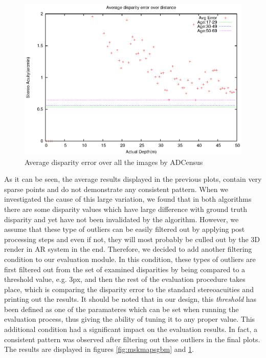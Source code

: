 \begin{figure}[H]
\centering
\includegraphics[scale=0.8]{adcenmsk1000}
\caption{Average disparity error over all the images by ADCensus}
\label{fig:mskmapadc}
\end{figure} 

As it can be seen, the average results displayed in the previous plots, contain very sparse points and 
do not demonstrate any consistent pattern. When we investigated the cause of this large variation, we found that in
both algorithms there are some disparity values which have large difference with ground truth disparity and yet have not been invalidated by the
algorithm. However, we assume that these type of outliers can be easily filtered out by applying post processing steps and even if 
not, they will most probably be culled out by the 3D render in AR system in the end. Therefore, we decided to add another filtering condition to our 
evaluation module. In this condition, these types of outliers are first filtered out from the set of examined disparities by being compared
to a threshold value, e.g. 3px, and then the rest of the
evaluation procedure takes place, which is comparing the disparity error to the standard stereoacuities and printing out the results. 
It should be noted that in our design, this \textit{threshold} has been defined as one of the paramateres which can be set 
when running the evaluation process, thus giving the ability of tuning it to any proper value.
This additional condition had a significant impact on the evaluation results. 
In fact, a consistent pattern was observed after filtering out these outliers in the final plots. The results are displayed in
figures \ref{fig:mskmapsgbm} and \ref{fig:mskmapadc}.

